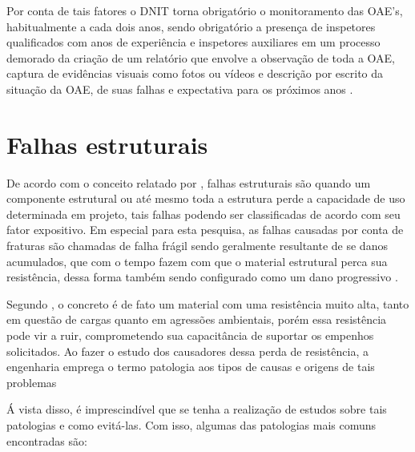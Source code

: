 Por conta de tais fatores o DNIT torna obrigatório o monitoramento das OAE's,  habitualmente a cada dois anos, sendo obrigatório a presença de inspetores qualificados com anos de experiência e inspetores auxiliares em um processo demorado da criação de um relatório que envolve a observação de toda a OAE, captura de evidências visuais como fotos ou vídeos e descrição por escrito da situação da OAE, de suas falhas e expectativa para os próximos anos \cite{dnit2004}.

\section{Falhas estruturais}

De acordo com o conceito relatado por , falhas estruturais são quando um componente estrutural ou até mesmo toda a estrutura perde a capacidade de uso determinada em projeto, tais falhas podendo ser classificadas de acordo com seu fator expositivo. 
Em especial para esta pesquisa, as falhas causadas por conta de fraturas são chamadas de falha frágil sendo geralmente resultante de se danos acumulados, que com o tempo fazem com que o material estrutural perca sua resistência, dessa forma também sendo configurado como um dano progressivo \cite{anneLink2016}.

 Segundo , o concreto é de fato um material com uma resistência muito alta, tanto em questão de cargas quanto em agressões ambientais, porém essa resistência pode vir a ruir, comprometendo sua capacitância de suportar os empenhos solicitados. 
 Ao fazer o estudo dos causadores dessa perda de resistência, a engenharia emprega o termo patologia aos tipos de causas e origens de tais problemas \cite{cremonini1988incidencia}
 
 Á vista disso, é imprescindível  que se tenha a realização de estudos sobre tais patologias e como evitá-las. Com isso, algumas das patologias mais comuns \cite{statera} encontradas são:

